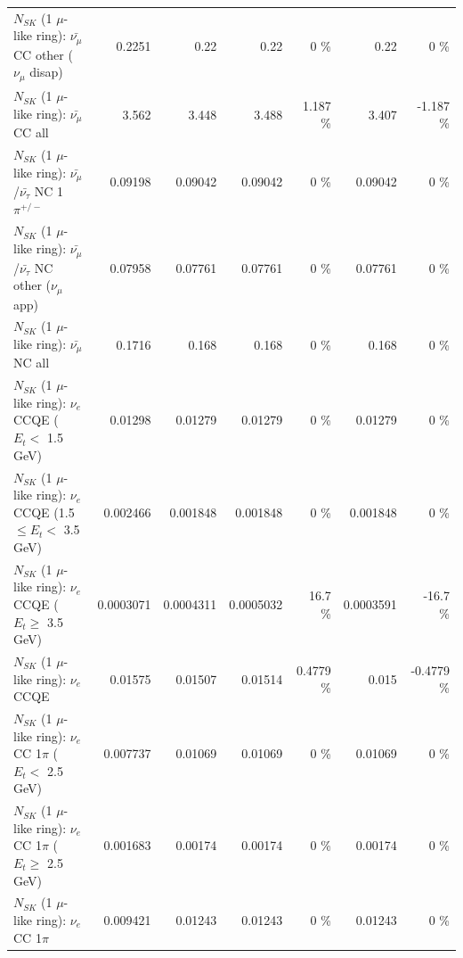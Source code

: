 \begin{table}
\begin{tabular}{| l | r | r | r  r | r  r |}
        $N_{SK}$ (1 $\mu$-like ring): $\bar{\nu_\mu}$ CC other ($\nu_\mu$ disap) &          0.2251 &            0.22 &            0.22 &        0 \%  &            0.22 &        0 \%  \\ 
                          $N_{SK}$ (1 $\mu$-like ring): $\bar{\nu_{\mu}}$ CC all &           3.562 &           3.448 &           3.488 &    1.187 \%  &           3.407 &   -1.187 \%  \\ 
\hline
  $N_{SK}$ (1 $\mu$-like ring): $\bar{\nu_\mu}$/$\bar{\nu_\tau}$ NC 1$\pi^{+/-}$ &         0.09198 &         0.09042 &         0.09042 &        0 \%  &         0.09042 &        0 \%  \\ 
$N_{SK}$ (1 $\mu$-like ring): $\bar{\nu_\mu}$/$\bar{\nu_\tau}$ NC other ($\nu_\mu$ app) &         0.07958 &         0.07761 &         0.07761 &        0 \%  &         0.07761 &        0 \%  \\ 
                          $N_{SK}$ (1 $\mu$-like ring): $\bar{\nu_{\mu}}$ NC all &          0.1716 &           0.168 &           0.168 &        0 \%  &           0.168 &        0 \%  \\ 
\hline
\hline
\hline
                  $N_{SK}$ (1 $\mu$-like ring): $\nu_e$ CCQE ($E_{t} <$ 1.5 GeV) &         0.01298 &         0.01279 &         0.01279 &        0 \%  &         0.01279 &        0 \%  \\ 
         $N_{SK}$ (1 $\mu$-like ring): $\nu_e$ CCQE (1.5 $\leq E_{t} <$ 3.5 GeV) &        0.002466 &        0.001848 &        0.001848 &        0 \%  &        0.001848 &        0 \%  \\ 
               $N_{SK}$ (1 $\mu$-like ring): $\nu_e$ CCQE ($E_{t} \geq$ 3.5 GeV) &       0.0003071 &       0.0004311 &       0.0005032 &     16.7 \%  &       0.0003591 &    -16.7 \%  \\ 
\hline
                                      $N_{SK}$ (1 $\mu$-like ring): $\nu_e$ CCQE &         0.01575 &         0.01507 &         0.01514 &   0.4779 \%  &           0.015 &  -0.4779 \%  \\ 
\hline
             $N_{SK}$ (1 $\mu$-like ring): $\nu_e$ CC 1$\pi$ ($E_{t} <$ 2.5 GeV) &        0.007737 &         0.01069 &         0.01069 &        0 \%  &         0.01069 &        0 \%  \\ 
          $N_{SK}$ (1 $\mu$-like ring): $\nu_e$ CC 1$\pi$ ($E_{t} \geq$ 2.5 GeV) &        0.001683 &         0.00174 &         0.00174 &        0 \%  &         0.00174 &        0 \%  \\ 
\hline
                                 $N_{SK}$ (1 $\mu$-like ring): $\nu_e$ CC 1$\pi$ &        0.009421 &         0.01243 &         0.01243 &        0 \%  &         0.01243 &        0 \%  \\ 

\end{tabular}
\end{table}
